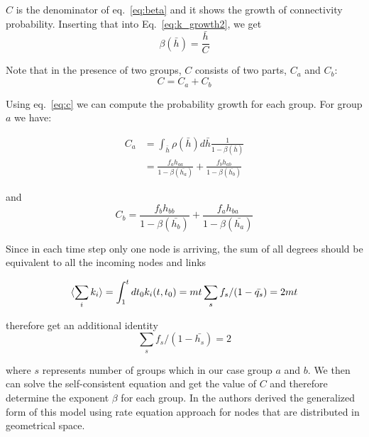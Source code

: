 $C$ is the denominator of eq.~\ref{eq:beta} and it shows the growth of connectivity probability. Inserting that into Eq.~\ref{eq:k_growth2}, we get
\begin{equation}
\label{eq:beta_2}
    \beta(\bar{h}) = \frac{\bar{h}}{C}
\end{equation}

Note that in the presence of two groups, $C$ consists of two parts, $C_{a}$ and $C_{b}$:
\begin{equation}
\label{eq:c_all}
   C = C_{a} + C_{b}
\end{equation}

Using eq.~\ref{eq:c} we can compute the probability growth for each group. For group $a$ we have:

\begin{align*}
\label{eq:c2}
  C_{a} &= \int_{\bar{h}} \rho(\bar{h}) d\bar{h} \frac{1}{1 - \beta(\bar{h}) } \\
    &= \frac{f_{a} h_{aa}}{1 - \beta(\bar{h_a})   } + \frac{f_{b} h_{ab}}{1 - \beta(\bar{h_b}) } 
\end{align*}

and
\begin{equation}
\label{eq:cc}
  C_{b} = \frac{f_{b} h_{bb}}{1 - \beta(\bar{h_b})   } + \frac{f_{a} h_{ba}}{1 - \beta(\bar{h_a}) } 
\end{equation}



Since in each time step only one node is arriving, the sum of all degrees should be equivalent to all the incoming nodes and links 

\begin{equation}
   \operatorname{}\langle\sum_{i}  k_i\rangle =  \int_{1}^{t} dt_{0} k_i(t,t_{0}) = mt \sum_s f_s / (1 - \bar{q_s}) = 2mt
\end{equation}

therefore get an additional identity
\begin{equation}
   \sum_s f_s / (1 - \bar{{h}_s}) = 2
\end{equation}



where $s$ represents number of groups which in our case group $a$ and $b$. We then can solve the self-consistent equation and get the value of $C$ and therefore determine the exponent $\beta$ for each group. In \cite{ferretti2012features} the authors derived the generalized form of this model using rate equation approach \cite{krapivsky2000connectivity} for nodes that are distributed in geometrical space.

